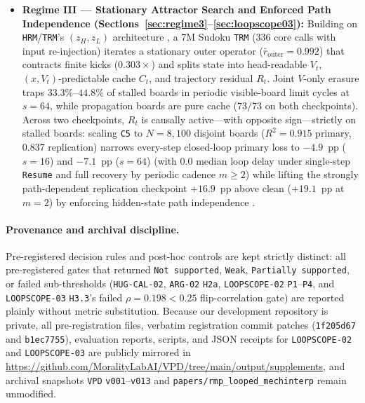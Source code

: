 \documentclass[10pt,letterpaper]{article}
\begin{document}
\begin{itemize}
  \item \textbf{Regime III — Stationary Attractor Search and Enforced Path Independence (Sections~\ref{sec:regime3}--\ref{sec:loopscope03}):} Building on \texttt{HRM}/\texttt{TRM}'s $(z_H, z_L)$ architecture \cite{wang2025hrm,jolicoeur2025trm}, a 7M Sudoku \texttt{TRM} (336 core calls with input re-injection) iterates a stationary outer operator ($\bar{r}_{\mathrm{outer}}=0.992$) that contracts finite kicks ($0.303\times$) and splits state into head-readable $V_t$, $(x,V_t)$-predictable cache $C_t$, and trajectory residual $R_t$. Joint $V$-only erasure traps $33.3\%$--$44.8\%$ of stalled boards in periodic visible-board limit cycles at $s=64$, while propagation boards are pure cache ($73/73$ on both checkpoints). Across two checkpoints, $R_t$ is causally active—with opposite sign—strictly on stalled boards: scaling \texttt{C5} to $N=8{,}100$ disjoint boards ($R^2 = 0.915$ primary, $0.837$ replication) narrows every-step closed-loop primary loss to $-4.9$~pp ($s=16$) and $-7.1$~pp ($s=64$) (with $0.0$ median loop delay under single-step \texttt{Resume} and full recovery by periodic cadence $m \ge 2$) while lifting the strongly path-dependent replication checkpoint $+16.9$~pp above clean ($+19.1$~pp at $m=2$) by enforcing hidden-state path independence \cite{anil2022path}.
\end{itemize}

\paragraph{Provenance and archival discipline.} Pre-registered decision rules and post-hoc controls are kept strictly distinct: all pre-registered gates that returned \texttt{Not supported}, \texttt{Weak}, \texttt{Partially supported}, or failed sub-thresholds (\texttt{HUG-CAL-02}, \texttt{ARG-02} \texttt{H2a}, \texttt{LOOPSCOPE-02} \texttt{P1}--\texttt{P4}, and \texttt{LOOPSCOPE-03} \texttt{H3.3}'s failed $\rho = 0.198 < 0.25$ flip-correlation gate) are reported plainly without metric substitution. Because our development repository is private, all pre-registration files, verbatim registration commit patches (\texttt{1f205d67} and \texttt{b1ec7755}), evaluation reports, scripts, and JSON receipts for \texttt{LOOPSCOPE-02} and \texttt{LOOPSCOPE-03} are publicly mirrored in \url{https://github.com/MoralityLabAI/VPD/tree/main/output/supplements}, and archival snapshots \texttt{VPD} \texttt{v001}--\texttt{v013} and \texttt{papers/rmp\_looped\_mechinterp} remain unmodified.
\end{document}

